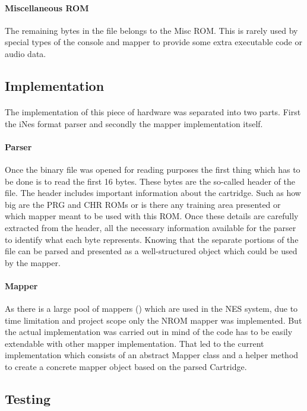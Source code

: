 \documentclass[]{report}
\begin{document}
\paragraph{Miscellaneous ROM}
The remaining bytes in the file belongs to the Misc ROM. This is rarely used by special types of the console and mapper to provide some extra executable code or audio data.

\subsection{Implementation}
\paragraph{ }
The implementation of this piece of hardware was separated into two parts. First the iNes format parser and secondly the mapper implementation itself.
\paragraph{Parser}
Once the binary file was opened for reading purposes the first thing which has to be done is to read the first 16 bytes. These bytes are the so-called header of the file. The header includes important information about the cartridge. Such as how big are the PRG and CHR ROMs or is there any training area presented or which mapper meant to be used with this ROM. Once these details are carefully extracted from the header, all the necessary information available for the parser to identify what each byte represents. Knowing that the separate portions of the file can be parsed and presented as a well-structured object which could be used by the mapper.
\paragraph{Mapper}
As there is a large pool of mappers (\cite{MPPR}) which are used in the NES system, due to time limitation and project scope only the NROM mapper was implemented. But the actual implementation was carried out in mind of the code has to be easily extendable with other mapper implementation. That led to the current implementation which consists of an abstract Mapper class and a helper method to create a concrete mapper object based on the parsed Cartridge.

\subsection{Testing}
\end{document}

